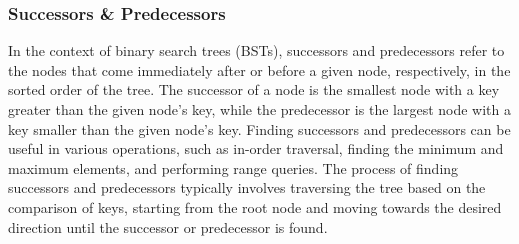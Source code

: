 \subsubsection{Successors \& Predecessors}

In the context of binary search trees (BSTs), successors and predecessors refer to the nodes that come immediately after or before a given node, respectively, in the sorted order of the tree. The successor of a node is the smallest node with a key greater than the given node's key, while the predecessor is the largest node 
with a key smaller than the given node's key. Finding successors and predecessors can be useful in various operations, such as in-order traversal, finding the minimum and maximum elements, and performing range queries. The process of finding successors and predecessors typically involves traversing the tree based on the comparison 
of keys, starting from the root node and moving towards the desired direction until the successor or predecessor is found.

